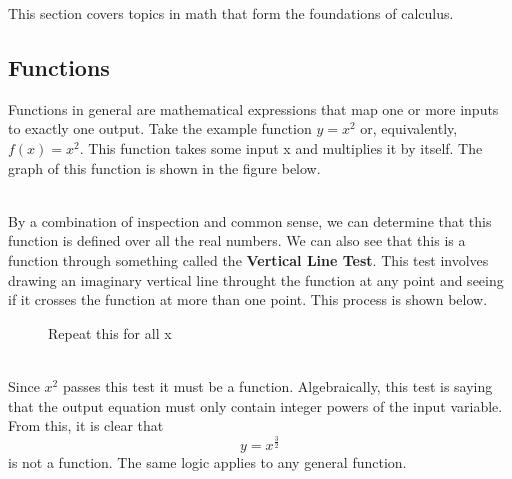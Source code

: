 \documentclass[../Math_Notes.tex]{subfiles}
\begin{document}
This section covers topics in math that form the foundations of calculus.
\subsection{Functions}
Functions in general are mathematical expressions that map one or more inputs to exactly one output. Take the example function $y=x^{2}$ or, equivalently, $f(x)=x^{2}$. This function takes some input x and multiplies it by itself. The graph of this function is shown in the figure below.
\begin{figure}[h]
  \centering
\end{figure}\\
By a combination of inspection and common sense, we can determine that this function is defined over all the real numbers. We can also see that this is a function through something called the \textbf{Vertical Line Test}. This test involves drawing an imaginary vertical line throught the function at any point and seeing if it crosses the function at more than one point. This process is shown below. 
\begin{figure}[h]
  \centering
  \caption*{Repeat this for all x}
\end{figure}\\
Since $x^{2}$ passes this test it must be a function. Algebraically, this test is saying that the output equation must only contain integer powers of the input variable. From this, it is clear that \[y=x^{\frac{3}{2}}\] is not a function. The same logic applies to any general function.
\end{document}
